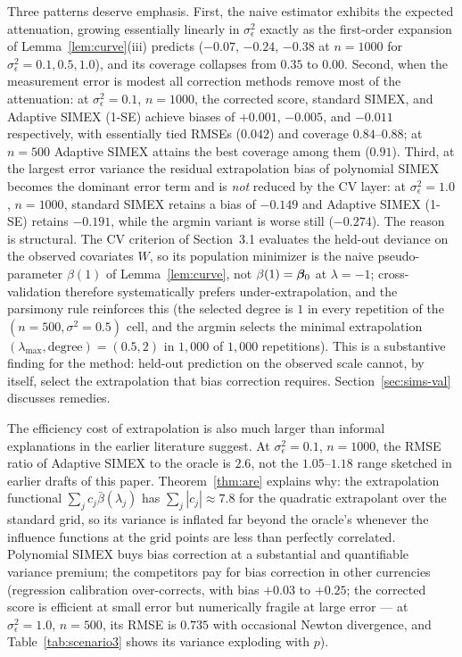 Three patterns deserve emphasis. First, the naive estimator exhibits
the expected attenuation, growing essentially linearly in
$\sigma^2_\epsilon$ exactly as the first-order expansion of
Lemma~\ref{lem:curve}(iii) predicts ($-0.07$, $-0.24$, $-0.38$ at
$n=1000$ for $\sigma^2_\epsilon=0.1,0.5,1.0$), and its coverage
collapses from $0.35$ to $0.00$. Second, when the measurement error is
modest all correction methods remove most of the attenuation: at
$\sigma^2_\epsilon=0.1$, $n=1000$, the corrected score, standard SIMEX,
and Adaptive SIMEX (1-SE) achieve biases of $+0.001$, $-0.005$, and
$-0.011$ respectively, with essentially tied RMSEs ($0.042$) and
coverage $0.84$--$0.88$; at $n=500$ Adaptive SIMEX attains the best
coverage among them ($0.91$). Third, at the largest error variance the
residual extrapolation bias of polynomial SIMEX becomes the dominant
error term and is \emph{not} reduced by the CV layer: at
$\sigma^2_\epsilon=1.0$, $n=1000$, standard SIMEX retains a bias of
$-0.149$ and Adaptive SIMEX (1-SE) retains $-0.191$, while the argmin
variant is worse still ($-0.274$). The reason is structural. The CV
criterion of Section~3.1 evaluates the held-out deviance on the
observed covariates $W$, so its population minimizer is the naive
pseudo-parameter $\beta(1)$ of Lemma~\ref{lem:curve}, not
$\beta(1)=\bm{\beta}_0$ at $\lambda=-1$; cross-validation therefore
systematically prefers under-extrapolation, and the parsimony rule
reinforces this (the selected degree is $1$ in every repetition of the
$(n{=}500,\sigma^2{=}0.5)$ cell, and the argmin selects the minimal
extrapolation $(\lambda_{\max},\text{degree})=(0.5,2)$ in $1{,}000$ of
$1{,}000$ repetitions). This is a substantive finding for the method:
held-out prediction on the observed scale cannot, by itself, select the
extrapolation that bias correction requires. Section~\ref{sec:sims-val}
discusses remedies.

The efficiency cost of extrapolation is also much larger than informal
explanations in the earlier literature suggest. At
$\sigma^2_\epsilon=0.1$, $n=1000$, the RMSE ratio of Adaptive SIMEX to
the oracle is $2.6$, not the $1.05$--$1.18$ range sketched in earlier
drafts of this paper. Theorem~\ref{thm:are} explains why: the
extrapolation functional $\sum_jc_j\bar\beta(\lambda_j)$ has
$\sum_j|c_j|\approx7.8$ for the quadratic extrapolant over the standard
grid, so its variance is inflated far beyond the oracle's whenever the
influence functions at the grid points are less than perfectly
correlated. Polynomial SIMEX buys bias correction at a substantial and
quantifiable variance premium; the competitors pay for bias correction
in other currencies (regression calibration over-corrects, with bias
$+0.03$ to $+0.25$; the corrected score is efficient at small error
but numerically fragile at large error --- at
$\sigma^2_\epsilon=1.0$, $n=500$, its RMSE is $0.735$ with occasional
Newton divergence, and Table~\ref{tab:scenario3} shows its variance
exploding with $p$).


